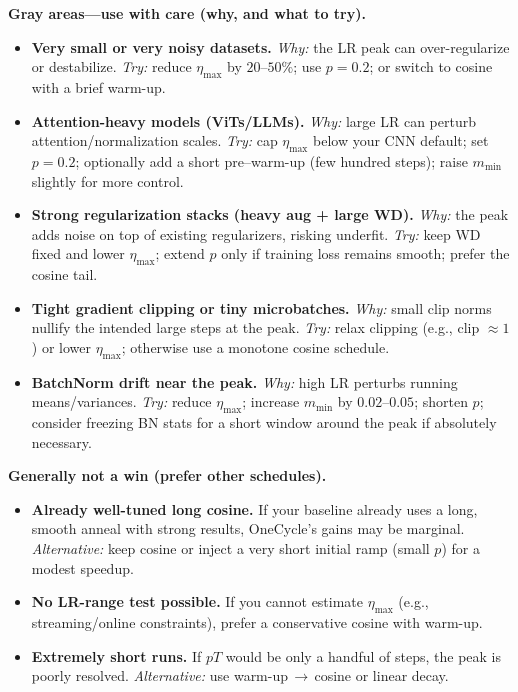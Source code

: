 \begin{enrichment}
	\medskip
	\noindent\textbf{Gray areas—use with care (why, and what to try).}
	\begin{itemize}
		\item \textbf{Very small or very noisy datasets.} \emph{Why:} the LR peak can over-regularize or destabilize. \emph{Try:} reduce $\eta_{\max}$ by $20$–$50\%$; use $p{=}0.2$; or switch to cosine with a brief warm-up.
		\item \textbf{Attention-heavy models (ViTs/LLMs).} \emph{Why:} large LR can perturb attention/normalization scales. \emph{Try:} cap $\eta_{\max}$ below your CNN default; set $p{=}0.2$; optionally add a short pre–warm-up (few hundred steps); raise $m_{\min}$ slightly for more control.
		\item \textbf{Strong regularization stacks (heavy aug + large WD).} \emph{Why:} the peak adds noise on top of existing regularizers, risking underfit. \emph{Try:} keep WD fixed and lower $\eta_{\max}$; extend $p$ only if training loss remains smooth; prefer the cosine tail.
		\item \textbf{Tight gradient clipping or tiny microbatches.} \emph{Why:} small clip norms nullify the intended large steps at the peak. \emph{Try:} relax clipping (e.g., clip $\approx 1$) or lower $\eta_{\max}$; otherwise use a monotone cosine schedule.
		\item \textbf{BatchNorm drift near the peak.} \emph{Why:} high LR perturbs running means/variances. \emph{Try:} reduce $\eta_{\max}$; increase $m_{\min}$ by $0.02$–$0.05$; shorten $p$; consider freezing BN stats for a short window around the peak if absolutely necessary.
	\end{itemize}
	
	\medskip
	\noindent\textbf{Generally not a win (prefer other schedules).}
	\begin{itemize}
		\item \textbf{Already well-tuned long cosine.} If your baseline already uses a long, smooth anneal with strong results, OneCycle’s gains may be marginal. \emph{Alternative:} keep cosine or inject a very short initial ramp (small $p$) for a modest speedup.
		\item \textbf{No LR-range test possible.} If you cannot estimate $\eta_{\max}$ (e.g., streaming/online constraints), prefer a conservative cosine with warm-up.
		\item \textbf{Extremely short runs.} If $pT$ would be only a handful of steps, the peak is poorly resolved. \emph{Alternative:} use warm-up\,$\rightarrow$\,cosine or linear decay.
	\end{itemize}
	

\end{enrichment}
